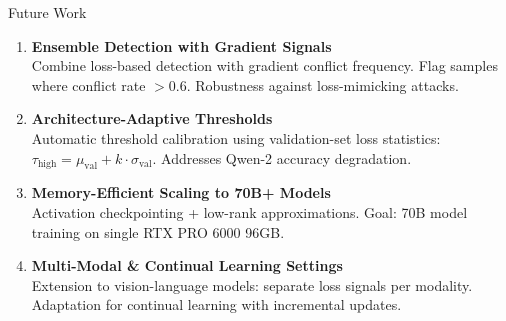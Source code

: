 \documentclass[aspectratio=169, 11pt]{beamer}
\begin{document}
\begin{frame}{Future Work}
\vspace{10pt}
\begin{enumerate}
  \item \textbf{Ensemble Detection with Gradient Signals}\\
  {\small Combine loss-based detection with gradient conflict frequency. Flag samples where conflict rate $> 0.6$. Robustness against loss-mimicking attacks.}

  \vspace{8pt}
  \item \textbf{Architecture-Adaptive Thresholds}\\
  {\small Automatic threshold calibration using validation-set loss statistics: $\tau_{\text{high}} = \mu_{\text{val}} + k \cdot \sigma_{\text{val}}$. Addresses Qwen-2 accuracy degradation.}

  \vspace{8pt}
  \item \textbf{Memory-Efficient Scaling to 70B+ Models}\\
  {\small Activation checkpointing + low-rank approximations. Goal: 70B model training on single RTX PRO 6000 96GB.}

  \vspace{8pt}
  \item \textbf{Multi-Modal \& Continual Learning Settings}\\
  {\small Extension to vision-language models: separate loss signals per modality. Adaptation for continual learning with incremental updates.}
\end{enumerate}
\end{frame}

{
\begin{frame}[plain]
\end{frame}
}
\end{document}
